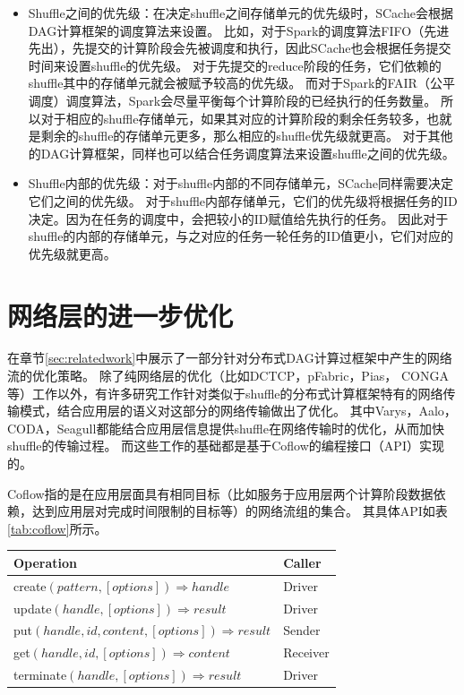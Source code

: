 \begin{itemize}
	\item Shuffle之间的优先级：在决定shuffle之间存储单元的优先级时，SCache会根据DAG计算框架的调度算法来设置。
	比如，对于Spark的调度算法FIFO（先进先出），先提交的计算阶段会先被调度和执行，因此SCache也会根据任务提交时间来设置shuffle的优先级。
	对于先提交的reduce阶段的任务，它们依赖的shuffle其中的存储单元就会被赋予较高的优先级。
	而对于Spark的FAIR（公平调度）调度算法，Spark会尽量平衡每个计算阶段的已经执行的任务数量。
	所以对于相应的shuffle存储单元，如果其对应的计算阶段的剩余任务较多，也就是剩余的shuffle的存储单元更多，那么相应的shuffle优先级就更高。
	对于其他的DAG计算框架，同样也可以结合任务调度算法来设置shuffle之间的优先级。
	\item Shuffle内部的优先级：对于shuffle内部的不同存储单元，SCache同样需要决定它们之间的优先级。
	对于shuffle内部存储单元，它们的优先级将根据任务的ID决定。因为在任务的调度中，会把较小的ID赋值给先执行的任务。
	因此对于shuffle的内部的存储单元，与之对应的任务一轮任务的ID值更小，它们对应的优先级就更高。
\end{itemize}

\section{网络层的进一步优化}
\label{sec:network}

在章节\ref{sec:relatedwork}中展示了一部分针对分布式DAG计算过框架中产生的网络流的优化策略。
除了纯网络层的优化（比如DCTCP\cite{dctcp}，pFabric\cite{pfabric}，Pias\cite{pias}， CONGA\cite{conga}等）工作以外，有许多研究工作针对类似于shuffle的分布式计算框架特有的网络传输模式，结合应用层的语义对这部分的网络传输做出了优化。
其中Varys\cite{varys}，Aalo\cite{aalo}，CODA\cite{coda}，Seagull\cite{seagull}都能结合应用层信息提供shuffle在网络传输时的优化，从而加快shuffle的传输过程。
而这些工作的基础都是基于Coflow\cite{coflow}的编程接口（API）实现的。

Coflow指的是在应用层面具有相同目标（比如服务于应用层两个计算阶段数据依赖，达到应用层对完成时间限制的目标等）的网络流组的集合。
其具体API\cite{coflow}如表\ref{tab:coflow}所示。

\begin{table}[!hpb]
    \centering
    \begin{tabular}{ | m{10cm} | m{5cm} | }
        \hline
        Operation & Caller \\ [0.5ex]
        \hline
        \hline
        create$(pattern, [options]) \Rightarrow handle$ & Driver\\ \hline
        update$(handle, [options]) \Rightarrow result$ & Driver \\ \hline
        put$(handle, id, content, [options]) \Rightarrow result$ & Sender \\ \hline
        get$(handle, id, [options]) \Rightarrow content$ & Receiver \\ \hline
        terminate$(handle, [options]) \Rightarrow result$ & Driver \\ 
        \hline
    \end{tabular}
\end{table}


